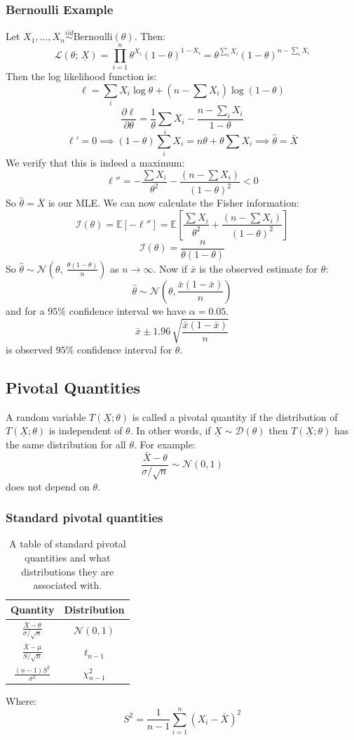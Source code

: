 \documentclass[12pt]{article}
\newcommand{\pf}[2]{\frac{\partial #1}{\partial #2}}
\newcommand{\iid}{\overset{iid}{\sim}}
\begin{document}
\subsubsection{Bernoulli Example}
Let \(X_1,\dots,X_n\iid\text{Bernoulli}(\theta)\). Then:
\[\mathcal{L}(\theta;\, \underline{X})=\prod^n_{i=1}\theta^{X_i}(1-\theta)^{1-X_i}=\theta^{\sum_i X_i}(1-\theta)^{n-\sum_i X_i}\]
Then the log likelihood function is:
\[\ell=\sum_i X_i\log\theta + (n-\sum X_i)\log(1-\theta)\]
\[\pf{\ell}{\theta}=\frac{1}{\theta}\sum_iX_i-\frac{n-\sum_iX_i}{1-\theta}\]
\[\ell'=0\implies (1-\theta)\sum_{i}X_i=n\theta+\theta\sum X_i\implies \hat{\theta}=\bar{X}\]
We verify that this is indeed a maximum:
\[\ell''=-\frac{\sum X_i}{\theta^2}-\frac{(n-\sum X_i)}{(1-\theta)^2}<0\]
So \(\hat{\theta}=\bar{X}\) is our MLE. We can now calculate the Fisher information:
\[\mathcal{I}(\theta)=\mathbb{E}[-\ell'']=\mathbb{E}\left[\frac{\sum X_i}{\theta^2}+\frac{(n-\sum X_i)}{(1-\theta)^2}\right]\]
\[\mathcal{I}(\theta)=\frac{n}{\theta(1-\theta)}\]
So \(\hat{\theta}\sim \mathcal{N}\left(\theta,\ \frac{\theta(1-\theta)}{n}\right)\) as \(n\to\infty\). Now if \(\bar{x}\) is the observed estimate for \(\theta\):
\[\hat{\theta}\sim \mathcal{N}\left(\theta,\frac{\bar{x}(1-\bar{x})}{n}\right)\]
and for a \(95\%\) confidence interval we have \(\alpha=0.05\).
\[\bar{x}\pm 1.96\,\sqrt{\frac{\bar{x}(1-\bar{x})}{n}}\]
is observed \(95\%\) confidence interval for \(\theta\).
\subsection{Pivotal Quantities}
A random variable \(T(\underline{X};\theta)\) is called a pivotal quantity if the distribution of \(T(\underline{X}; \theta)\) is independent of \(\theta\). In other words, if \(\underline{X}\sim \mathcal{D}(\theta)\) then \(T(\underline{X}; \theta)\) has the same distribution for all \(\theta\). For example:
\[\frac{\bar{X}-\theta}{\sigma/\sqrt{n}}\sim\mathcal{N}(0,1)\]
does not depend on \(\theta\).
\subsubsection{Standard pivotal quantities}
\begin{table}[H]
    \centering
    \begin{tabular}{|c|c|}
        \hline
        \textbf{Quantity} & \textbf{Distribution} \\ \hline
        \(\frac{\bar{X}-\theta}{\sigma/\sqrt{n}}\) & \(\mathcal{N}(0,1)\) \\ \hline
        \(\frac{\bar{X}-\mu}{S/\sqrt{n}}\) & \(t_{n-1}\) \\ \hline
        \(\frac{(n-1)S^2}{\sigma^2}\) & \(\chi^2_{n-1}\) \\ \hline
    \end{tabular}
    \caption{A table of standard pivotal quantities and what distributions they are associated with.}
\end{table}
Where:
\[S^2=\frac{1}{n-1}\sum^n_{i=1}(X_i-\bar{X})^2\]
\end{document}
